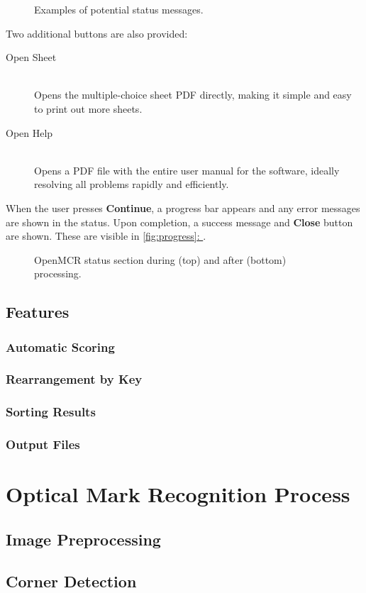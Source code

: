 \documentclass[12pt, letterpaper]{report}
\newcommand*{\itemref}[1]{\hypersetup{linkcolor=usfgreen}\hyperref[{#1}]{\autoref*{#1}: \nameref*{#1}}}
\newcommand*{\boxedimage}[1]{\fbox{\texttt{[image: \#1]}}}
\newcommand{\fig}[3]{
  \begin{figure}[h]
    \caption{#1}
    \label{#3}
    \centering
    \boxedimage{#2}
  \end{figure}
}
\newcommand*{\descitem}[1]{\item[#1] \hfill \\ }
\begin{document}
\fig{Examples of potential status messages.}{statuses.png}{fig:statuses}

Two additional buttons are also provided:
\begin{description}
  \descitem{Open Sheet} Opens the multiple-choice sheet PDF directly, making it
  simple and easy to print out more sheets.
  \descitem{Open Help} Opens a PDF file with the entire user manual for the
  software, ideally resolving all problems rapidly and efficiently.
\end{description}

When the user presses \textbf{Continue}, a progress bar appears and any error
messages are shown in the status. Upon completion, a success message and \textbf{Close}
button are shown. These are visible in \itemref{fig:progress}.

\fig{OpenMCR status section during (top) and after (bottom) processing.}{progress.png}{fig:progress}


\subsection{Features}
\subsubsection{Automatic Scoring}
\label{sect:scoring}
\subsubsection{Rearrangement by Key}
\label{sect:rearranging}
\subsubsection{Sorting Results}
\subsubsection{Output Files}
\section{Optical Mark Recognition Process}
\label{sect:process}
\subsection{Image Preprocessing}
\subsection{Corner Detection}
\label{sect:cornerfinding}
\end{document}
